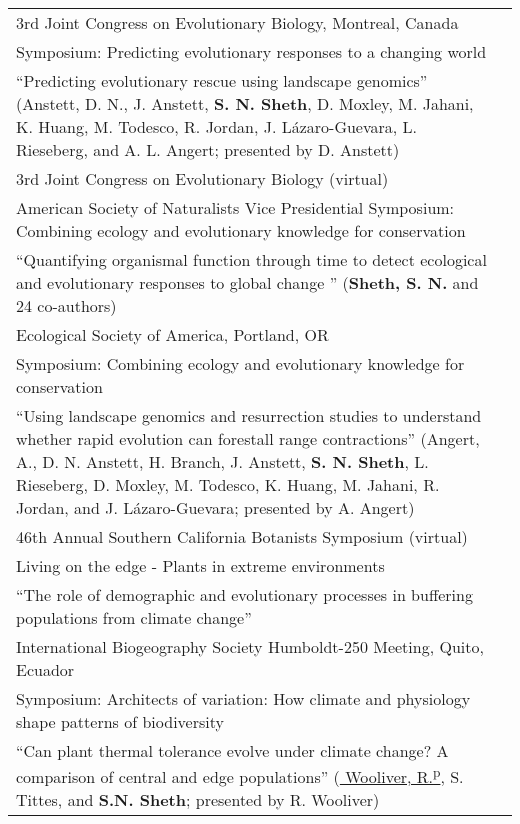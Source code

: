 \documentclass[11pt,english]{article}\usepackage[]{graphicx}\usepackage[]{xcolor}
\providecommand{\tabularnewline}{\\}
\begin{document}
\begin{tabularx}{\textwidth}{@{}>{\raggedright}p{5.25in}
>{\raggedleft}X@{}}

3rd Joint Congress on Evolutionary Biology, Montreal, Canada & 2024 \tabularnewline
\addtolength{\leftskip}{5ex} Symposium: Predicting evolutionary responses to a changing world  \tabularnewline
\addtolength{\leftskip}{5ex} ``Predicting evolutionary rescue using landscape genomics'' (Anstett, D. N., J. Anstett, \textbf{S. N. Sheth}, D. Moxley, M. Jahani,  K. Huang, M. Todesco, R. Jordan, J. L\'azaro-Guevara, L. Rieseberg, and A. L. Angert; presented by D. Anstett)
\tabularnewline

3rd Joint Congress on Evolutionary Biology (virtual) & 2024 \tabularnewline
\addtolength{\leftskip}{5ex} American Society of Naturalists Vice Presidential Symposium: Combining ecology and evolutionary knowledge for conservation  \tabularnewline
\addtolength{\leftskip}{5ex} ``Quantifying organismal function through time to detect ecological and evolutionary responses to global change '' (\textbf{Sheth, S. N.} and 24 co-authors)
\tabularnewline

Ecological Society of America, Portland, OR & 2023 \tabularnewline
\addtolength{\leftskip}{5ex} Symposium: Combining ecology and evolutionary knowledge for conservation  \tabularnewline
\addtolength{\leftskip}{5ex} ``Using landscape genomics and resurrection studies to understand whether rapid evolution can forestall range contractions'' (Angert, A., D. N. Anstett, H. Branch, J. Anstett, \textbf{S. N. Sheth}, L. Rieseberg, D. Moxley, M. Todesco, K. Huang, M. Jahani, R. Jordan, and J. L\'azaro-Guevara; presented by A. Angert)
\tabularnewline

46th Annual Southern California Botanists Symposium (virtual) & 2020 \tabularnewline
\addtolength{\leftskip}{5ex} Living on the edge - Plants in extreme environments \tabularnewline
\addtolength{\leftskip}{5ex} ``The role of demographic and evolutionary processes in buffering populations from climate change''
\tabularnewline

International Biogeography Society Humboldt-250 Meeting, Quito, Ecuador & 2019 \tabularnewline
\addtolength{\leftskip}{5ex} Symposium: Architects of variation: How climate and physiology shape patterns of biodiversity  \tabularnewline
\addtolength{\leftskip}{5ex} ``Can plant thermal tolerance evolve under climate change? A comparison of central and edge populations'' (\underline{ Wooliver, R.\textsuperscript{p}}, S. Tittes, and \textbf{S.N. Sheth}; presented by R. Wooliver)
\tabularnewline


\end{tabularx}
\end{document}
